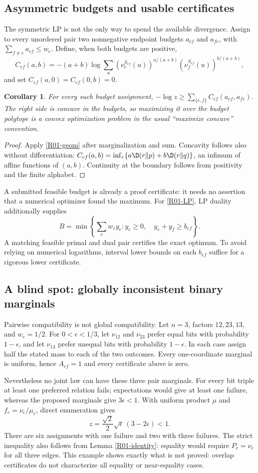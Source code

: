 \documentclass[11pt,a4paper]{article}
\newtheorem{corollary}[theorem]{Corollary}
\theoremstyle{definition}\newtheorem{definition}[theorem]{Definition}
\theoremstyle{remark}\newtheorem{remark}[theorem]{Remark}
\numberwithin{equation}{section}
\begin{document}
\subsection{Asymmetric budgets and usable certificates}\label{R01-sec-3}
The symmetric LP is not the only way to spend the available divergence. Assign to every unordered pair two nonnegative endpoint budgets $a_{ef}$ and $a_{fe}$, with $\sum_{f\ne e}a_{ef}\leq w_e$. Define, when both budgets are positive,
\[
C_{ef}(a,b)=-(a+b)\log\sum_u(\nu_e^{S_{ef}}(u))^{a/(a+b)}
(\nu_f^{S_{ef}}(u))^{b/(a+b)},
\]
and set $C_{ef}(a,0)=C_{ef}(0,b)=0$.
\begin{corollary}\label{R01-asym}
For every such budget assignment, $-\log z\geq\sum_{\{e,f\}}C_{ef}(a_{ef},a_{fe})$.
The right side is concave in the budgets, so maximizing it over the budget polytope is a convex optimization problem in the usual ``maximize concave'' convention.
\end{corollary}
\begin{proof}
Apply \eqref{R01-geom} after marginalization and sum. Concavity follows also without differentiation: $C_{ef}(a,b)=\inf_r\{a\D(r\Vert p)+b\D(r\Vert q)\}$, an infimum of affine functions of $(a,b)$. Continuity at the boundary follows from positivity and the finite alphabet.
\end{proof}
A submitted feasible budget is already a proof certificate: it needs no assertion that a numerical optimizer found the maximum. For \eqref{R01-LP}, LP duality additionally supplies
\[
B=\min\left\{\sum_e w_e y_e:y_e\geq0,\quad y_e+y_f\geq b_{ef}\right\}.
\]
A matching feasible primal and dual pair certifies the exact optimum. To avoid relying on numerical logarithms, interval lower bounds on each $b_{ef}$ suffice for a rigorous lower certificate.

\subsection{A blind spot: globally inconsistent binary marginals}\label{R01-sec-4}
Pairwise compatibility is not global compatibility. Let $n=3$, factors $12,23,13$, and $w_e=1/2$. For $0<\epsilon<1/3$, let $\nu_{12}$ and $\nu_{23}$ prefer equal bits with probability $1-\epsilon$, and let $\nu_{13}$ prefer unequal bits with probability $1-\epsilon$. In each case assign half the stated mass to each of the two outcomes. Every one-coordinate marginal is uniform, hence $A_{ef}=1$ and every certificate above is zero.

Nevertheless no joint law can have these three pair marginals. For every bit triple at least one preferred relation fails; expectations would give at least one failure, whereas the proposed marginals give $3\epsilon<1$. With uniform product $\mu$ and $f_e=\nu_e/\mu_e$, direct enumeration gives
\[
z=\frac{\sqrt2}{2}\sqrt\epsilon\,(3-2\epsilon)<1.
\]
There are six assignments with one failure and two with three failures. The strict inequality also follows from Lemma \ref{R01-identity}: equality would require $P_e=\nu_e$ for all three edges. This example shows exactly what is not proved: overlap certificates do not characterize all equality or near-equality cases.
\end{document}
